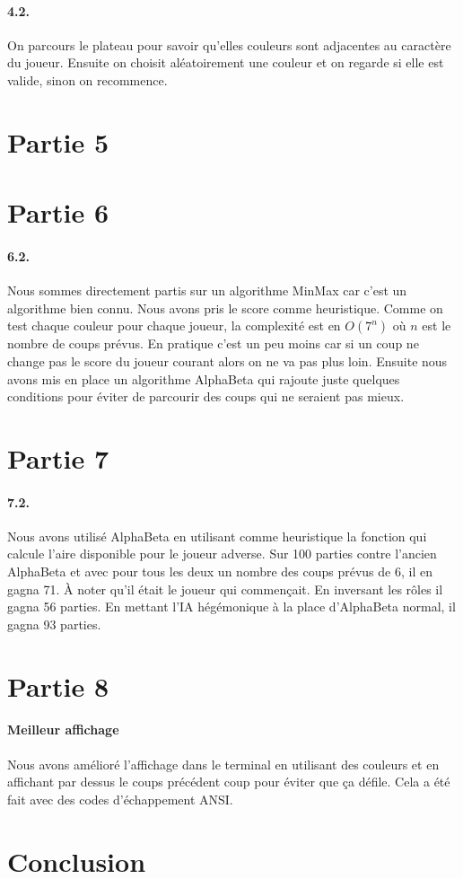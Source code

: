 \documentclass[a4paper]{article}
\begin{document}
    \paragraph{4.2.} On parcours le plateau pour savoir qu'elles couleurs sont
    adjacentes au caractère du joueur. Ensuite on choisit aléatoirement une
    couleur et on regarde si elle est valide, sinon on recommence.

    \section{Partie 5}

    \section{Partie 6}
    \paragraph{6.2.} Nous sommes directement partis sur un algorithme MinMax
    car c'est un algorithme bien connu. Nous avons pris le score comme
    heuristique. Comme on test chaque couleur pour chaque joueur, la complexité
    est en $O(7^n)$ où $n$ est le nombre de coups prévus. En pratique c'est un
    peu moins car si un coup ne change pas le score du joueur courant alors on
    ne va pas plus loin.  Ensuite nous avons mis en place un algorithme
    AlphaBeta qui rajoute juste quelques conditions pour éviter de parcourir
    des coups qui ne seraient pas mieux.

    \section{Partie 7}
    \paragraph{7.2.} Nous avons utilisé AlphaBeta en utilisant comme
    heuristique la fonction qui calcule l'aire disponible pour le joueur
    adverse. Sur 100 parties contre l'ancien AlphaBeta et avec pour tous les
    deux un nombre des coups prévus de 6, il en gagna 71. À noter qu'il était
    le joueur qui commençait. En inversant les rôles il gagna 56 parties.
    En mettant l'IA hégémonique à la place d'AlphaBeta normal, il gagna 93
    parties.


    \section{Partie 8}
    \paragraph{Meilleur affichage} Nous avons amélioré l'affichage dans le
    terminal en utilisant des couleurs et en affichant par dessus le coups
    précédent coup pour éviter que ça défile. Cela a été fait avec des codes
    d'échappement ANSI.

    \section{Conclusion}
\end{document}
